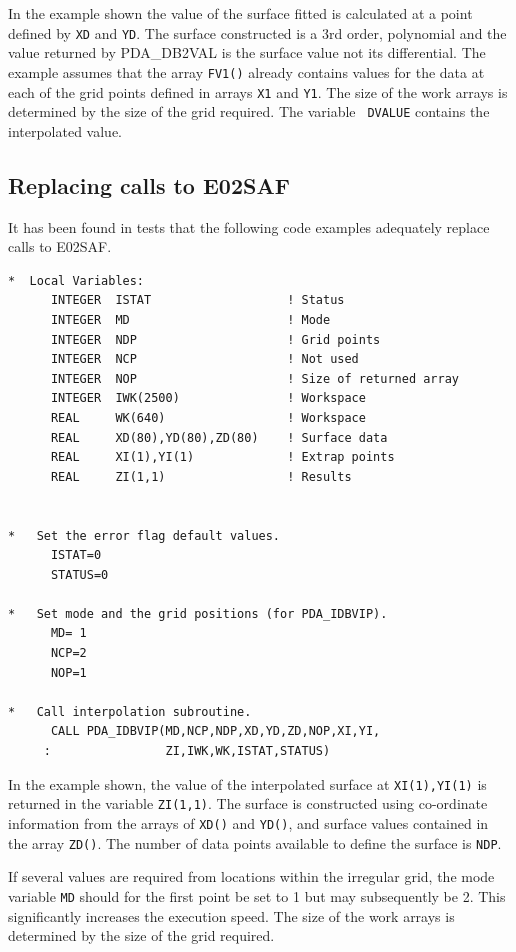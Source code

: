 \documentclass[11pt,twoside]{article}
\newcommand{\xlabel}[1]{}
\begin{document}
In the example shown the value of the surface fitted is 
calculated at a point defined by {\tt XD} and {\tt YD}. The 
surface constructed is a 3rd order, polynomial and the value 
returned by PDA\_DB2VAL is the surface value not its differential. 
The example assumes that the array {\tt FV1()} already contains 
values for the data at each of the grid points defined in 
arrays {\tt X1} and {\tt Y1}. The size of the work arrays is
determined by the size of the grid required. The variable {\tt
DVALUE} contains the interpolated value.


\subsection{\xlabel{replacing_calls_to_e02saf}Replacing calls to E02SAF}

It has been found in tests that the following code examples adequately 
replace calls to E02SAF.

\begin{verbatim}
*  Local Variables:
      INTEGER  ISTAT                   ! Status
      INTEGER  MD                      ! Mode
      INTEGER  NDP                     ! Grid points
      INTEGER  NCP                     ! Not used
      INTEGER  NOP                     ! Size of returned array
      INTEGER  IWK(2500)               ! Workspace    
      REAL     WK(640)                 ! Workspace
      REAL     XD(80),YD(80),ZD(80)    ! Surface data
      REAL     XI(1),YI(1)             ! Extrap points
      REAL     ZI(1,1)                 ! Results 


*   Set the error flag default values.
      ISTAT=0
      STATUS=0
 
*   Set mode and the grid positions (for PDA_IDBVIP).
      MD= 1
      NCP=2
      NOP=1
               
*   Call interpolation subroutine.      
      CALL PDA_IDBVIP(MD,NCP,NDP,XD,YD,ZD,NOP,XI,YI, 
     :                ZI,IWK,WK,ISTAT,STATUS)                       
\end{verbatim}

In the example shown, the value of the interpolated surface 
at {\tt XI(1),YI(1)} is returned in the variable {\tt ZI(1,1)}. 
The surface is constructed using
co-ordinate information from the arrays of {\tt XD()} and {\tt YD()}, 
and surface values contained in the array {\tt ZD()}. The number
of data points available to define the surface is {\tt NDP}.

If several values are required from locations within the 
irregular grid, the mode variable {\tt MD} should for the first
point be set to 1 but may subsequently be 2. This
significantly increases the execution speed. The size of the work 
arrays is determined by the size of the grid required. 
\end{document}
